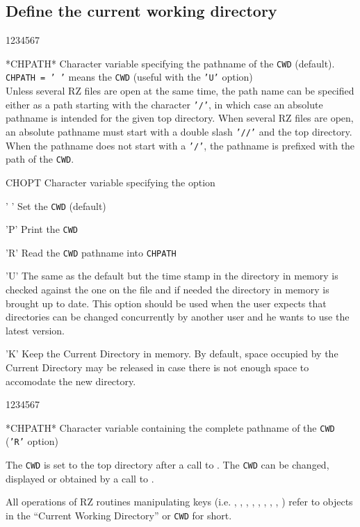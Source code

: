 \subsection{Define the current working directory}
\Idesc
\begin{DLtt}{1234567}
\item[*CHPATH*]Character variable specifying the pathname of the {\tt CWD}
(default).\\
{\tt CHPATH = ' '} means the {\tt CWD} (useful with the {\tt'U'} option)\\
Unless several RZ files are open at the same time, the path name can
be specified either as a path starting with the character {\tt'/'}, in
which case an absolute pathname is intended for the given top directory.
When several RZ files are open, an absolute pathname must start with a
double slash {\tt'//'} and the top directory.
When the pathname does not start with a {\tt'/'}, the pathname is prefixed
with the path of the {\tt CWD}.
\item[CHOPT]Character variable specifying the option
\begin{DLtt}{12}
\item[' ']Set the {\tt CWD} (default)
\item['P']Print the {\tt CWD}
\item['R']Read the {\tt CWD} pathname into {\tt CHPATH}
\item['U']The same as the default but the time stamp in the
directory in memory is checked against the one on the file and if
needed the directory in memory is brought up to date.
This option should be used when the user expects that directories can be
changed concurrently by another user and he wants to use the latest
version.
\item['K']Keep the Current Directory in memory. By default, space occupied
by the Current Directory may be released in case there is not enough
space to accomodate the new directory.
\end{DLtt}
\end{DLtt}
\Odesc
\begin{DLtt}{1234567}
\item[*CHPATH*]Character variable containing the complete pathname of the
{\tt CWD} ({\tt'R'} option)
\end{DLtt}
\par 
The {\tt CWD} is set to the top directory after a call to .
The {\tt CWD} can be changed, displayed or obtained by a call to .
\par 
All operations of RZ routines manipulating keys
(i.e. , , , ,
, , , ,
) refer to objects in
the ``Current Working Directory'' or {\tt CWD} for short.

